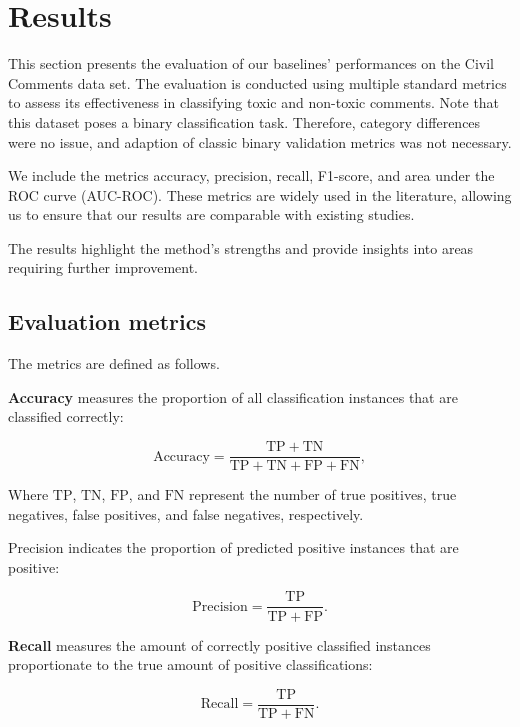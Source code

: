 \section{Results}
This section presents the evaluation of our baselines' performances on the Civil Comments data set. The evaluation is conducted using multiple standard metrics to assess its effectiveness in classifying toxic and non-toxic comments. Note that this dataset poses a binary classification task. Therefore, category differences were no issue, and adaption of classic binary validation metrics was not necessary.

We include the metrics accuracy, precision, recall, F1-score, and area under the ROC curve (AUC-ROC). These metrics are widely used in the literature, allowing us to ensure that our results are comparable with existing studies. \cite{Androcec2020, Duchene2023, Gladwin2022} 

The results highlight the method's strengths and provide insights into areas requiring further improvement.

\subsection{Evaluation metrics}
The metrics are defined as follows.

\textbf{Accuracy} measures the proportion of all classification instances that are classified correctly:

\begin{equation}
    \mathrm{Accuracy} = \frac{\mathrm{TP} + \mathrm{TN}}{\mathrm{TP} + \mathrm{TN} + \mathrm{FP} + \mathrm{FN}},
\end{equation}

Where $\mathrm{TP}$, $\mathrm{TN}$, $\mathrm{FP}$, and $\mathrm{FN}$ represent the number of true positives, true negatives, false positives, and false negatives, respectively.

Precision indicates the proportion of predicted positive instances that are positive:

\begin{equation}
    \mathrm{Precision} = \frac{\mathrm{TP}}{\mathrm{TP} + \mathrm{FP}}.
\end{equation}

\textbf{Recall} measures the amount of correctly positive classified instances proportionate to the true amount of positive classifications:

\begin{equation}
    \mathrm{Recall} = \frac{\mathrm{TP}}{\mathrm{TP} + \mathrm{FN}}.
\end{equation}

